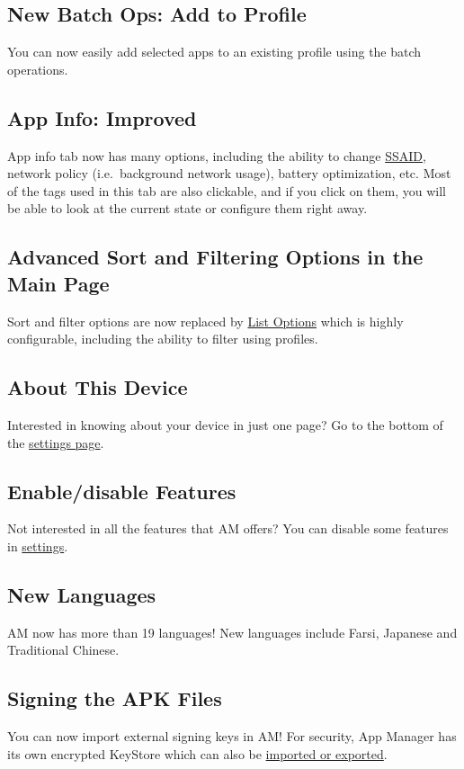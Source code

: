 \subsection{New Batch Ops: Add to Profile}
You can now easily add selected apps to an existing profile using the batch operations.

\subsection{App Info: Improved}
App info tab now has many options, including the ability to change \hyperref[sec:terminologies]{SSAID}, network policy
(i.e.\ background network usage), battery optimization, etc.
Most of the tags used in this tab are also clickable, and if you click on them, you will be able to look at the current
state or configure them right away.

\subsection{Advanced Sort and Filtering Options in the Main Page}
Sort and filter options are now replaced by \hyperref[subsubsec:main-list-options]{List Options} which is highly configurable,
including the ability to filter using profiles.

\subsection{About This Device}
Interested in knowing about your device in just one page?
Go to the bottom of the \hyperref[subsec:device-info]{settings page}.

\subsection{Enable/disable Features}
Not interested in all the features that AM offers?
You can disable some features in \hyperref[subsubsec:enable/disable-features]{settings}.

\subsection{New Languages}
AM now has more than 19 languages!
New languages include Farsi, Japanese and Traditional Chinese.

\subsection{Signing the APK Files}
You can now import external signing keys in AM! For security, App Manager has its own encrypted KeyStore which can also be \hyperref[subsubsec:import/export-keystore]{imported or exported}.

